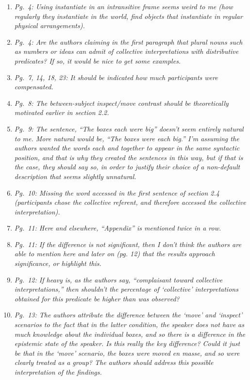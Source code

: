 \documentclass[12pt]{article}
\begin{document}
\begin{enumerate}
\item \emph{Pg.~4: Using \emph{instantiate} in an intransitive frame seems weird to me (\emph{how regularly they instantiate in the world}, \emph{find objects that instantiate in regular physical arrangements}).}
	
\item \emph{Pg.~4: Are the authors claiming in the first paragraph that plural nouns such as numbers or ideas can admit of collective interpretations with distributive predicates? If so, it would be nice to get some examples.}

\item \emph{Pg.~7, 14, 18, 23: It should be indicated how much participants were compensated.}

\item \emph{Pg.~8: The between-subject inspect/move contrast should be theoretically motivated earlier in section 2.2.}

\item \emph{Pg.~9: The sentence, ``The boxes each were big'' doesn't seem entirely natural to me. More natural would be, ``The boxes were each big.'' I'm assuming the authors wanted the words each and together to appear in the same syntactic position, and that is why they created the sentences in this way, but if that is the case, they should say so, in order to justify their choice of a non-default description that seems slightly unnatural.}
	
\item \emph{Pg.~10: Missing the word \emph{accessed} in the first sentence of section 2.4 (\emph{participants chose the collective referent, and therefore accessed the collective interpretation}).}

\item \emph{Pg.~11: Here and elsewhere, ``Appendix'' is mentioned twice in a row.}

\item \emph{Pg.~11: If the difference is not significant, then I don't think the authors are able to mention here and later on (pg. 12) that the results approach significance, or highlight this.}

\item \emph{Pg.~12: If \emph{heavy} is, as the authors say, ``complaisant toward collective interpretations,'' then shouldn't the percentage of `collective' interpretations obtained for this predicate be higher than was observed?}

\item \emph{Pg.~13: The authors attribute the difference between the `move' and `inspect' scenarios to the fact that in the latter condition, the speaker does not have as much knowledge about the individual boxes, and so there is a difference in the epistemic state of the speaker. Is this really the key difference? Could it just be that in the `move' scenario, the boxes were moved en masse, and so were clearly treated as a group? The authors should address this possible interpretation of the findings.}


\end{enumerate}
\end{document}
